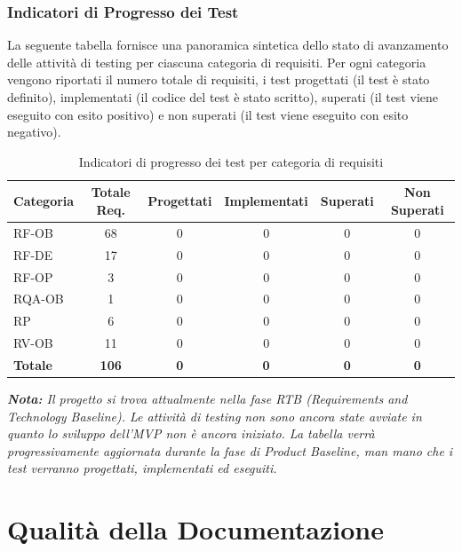 \documentclass[a4paper,11pt,oneside]{scrartcl}
\begin{document}
\newpage
\subsubsection{Indicatori di Progresso dei Test}

La seguente tabella fornisce una panoramica sintetica dello stato di avanzamento delle attività di testing per ciascuna categoria di requisiti. Per ogni categoria vengono riportati il numero totale di requisiti, i test progettati (il test è stato definito), implementati (il codice del test è stato scritto), superati (il test viene eseguito con esito positivo) e non superati (il test viene eseguito con esito negativo).

\begin{table}[H]
\centering
\renewcommand{\arraystretch}{1.3}
\begin{tabularx}{\textwidth}{@{}lCCCCC@{}}
\toprule
\textbf{Categoria} & \textbf{Totale Req.} & \textbf{Progettati} & \textbf{Implementati} & \textbf{Superati} & \textbf{Non Superati} \\
\midrule
RF-OB  & 68 & 0 & 0 & 0 & 0 \\
RF-DE  & 17 & 0 & 0 & 0 & 0 \\
RF-OP  &  3 & 0 & 0 & 0 & 0 \\
RQA-OB &  1 & 0 & 0 & 0 & 0 \\
RP     &  6 & 0 & 0 & 0 & 0 \\
RV-OB  & 11 & 0 & 0 & 0 & 0 \\
\midrule
\textbf{Totale} & \textbf{106} & \textbf{0} & \textbf{0} & \textbf{0} & \textbf{0} \\
\bottomrule
\end{tabularx}
\caption{Indicatori di progresso dei test per categoria di requisiti}
\end{table}

\vspace{0.3cm}
\noindent\textit{\textbf{Nota:} Il progetto si trova attualmente nella fase RTB (Requirements and Technology Baseline). Le attività di testing non sono ancora state avviate in quanto lo sviluppo dell'MVP non è ancora iniziato. La tabella verrà progressivamente aggiornata durante la fase di Product Baseline, man mano che i test verranno progettati, implementati ed eseguiti.}

\newpage
\section{Qualità della Documentazione}
\end{document}
